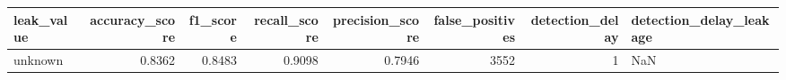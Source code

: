 \begin{tabular}{lrrrrrrl}
\toprule
leak\_value & accuracy\_score & f1\_score & recall\_score & precision\_score & false\_positives & detection\_delay & detection\_delay\_leakage \\
\midrule
unknown & 0.8362 & 0.8483 & 0.9098 & 0.7946 & 3552 & 1 & NaN \\
\bottomrule
\end{tabular}
